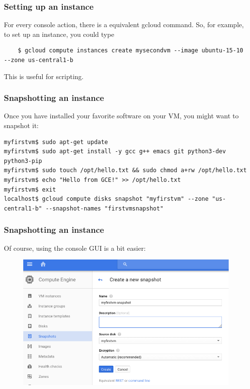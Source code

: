 \documentclass[9pt]{beamer}
\begin{document}
\begin{frame}[fragile]
  \frametitle{Setting up an instance}
  For every console action, there is a equivalent gcloud command. So, for example, to set up an instance, you could type
  \begin{verbatim}
    $ gcloud compute instances create mysecondvm --image ubuntu-15-10 --zone us-central1-b
  \end{verbatim}
  This is useful for scripting.
\end{frame}

\begin{frame}[fragile]
  \frametitle{Snapshotting an instance}
  Once you have installed your favorite software on your VM, you might want to snapshot it:
  \begin{verbatim}
myfirstvm$ sudo apt-get update
myfirstvm$ sudo apt-get install -y gcc g++ emacs git python3-dev python3-pip
myfirstvm$ sudo touch /opt/hello.txt && sudo chmod a+rw /opt/hello.txt
myfirstvm$ echo "Hello from GCE!" >> /opt/hello.txt
myfirstvm$ exit
localhost$ gcloud compute disks snapshot "myfirstvm" --zone "us-central1-b" --snapshot-names "firstvmsnapshot"
  \end{verbatim}  
\end{frame}

\begin{frame}[fragile]
  \frametitle{Snapshotting an instance}
  Of course, using the console GUI is a bit easier:
  \begin{figure}
    \includegraphics[scale=0.3]{figures/SnapshotVM.png}
  \end{figure}
\end{frame}
\end{document}
